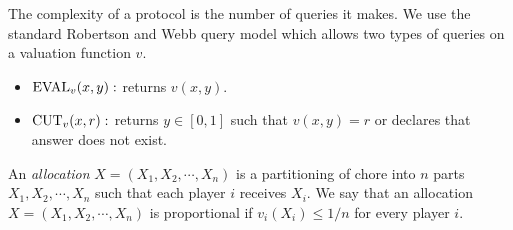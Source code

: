The complexity of a protocol is the number of queries it makes. We use the standard Robertson and Webb query model which allows two types of queries on a valuation function $v$.
\begin{itemize}
\item ${\operatorname{EVAL}}_{v}(x,y) : $ returns $v(x,y)$.
\item ${\operatorname{CUT}}_{v} (x,r) : $ returns $y \in [0,1]$ such that $v(x,y)=r$ or declares that answer does not exist.
\end{itemize}

An \textit{allocation} $X=(X_1,X_2,\cdots,X_n)$ is a partitioning of chore into $n$ parts  $X_1,X_2,\cdots,X_n$ such that each player $i$ receives $X_i$. We say that an allocation $X=(X_1,X_2,\cdots,X_n)$ is proportional if $v_i(X_i) \le 1/n$ for every player $i$.
